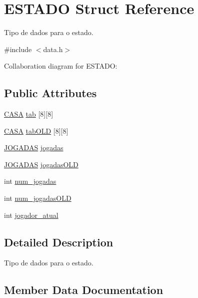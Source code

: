\hypertarget{structESTADO}{}\section{E\+S\+T\+A\+DO Struct Reference}
\label{structESTADO}


Tipo de dados para o estado.  




{\ttfamily \#include $<$data.\+h$>$}



Collaboration diagram for E\+S\+T\+A\+DO\+:
\subsection*{Public Attributes}
\begin{DoxyCompactItemize}
\item 
\hyperlink{data_8h_aba91601f16d4c485b2d9b8c429f27039}{C\+A\+SA} \hyperlink{structESTADO_ab56f0f1be16954d3768b4174d14c087d}{tab} \mbox{[}8\mbox{]}\mbox{[}8\mbox{]}
\item 
\hyperlink{data_8h_aba91601f16d4c485b2d9b8c429f27039}{C\+A\+SA} \hyperlink{structESTADO_a66bbe063098bbfc016ee8a21672e2bbd}{tab\+O\+LD} \mbox{[}8\mbox{]}\mbox{[}8\mbox{]}
\item 
\hyperlink{data_8h_a94c221d29a1760f008b7834093259b7d}{J\+O\+G\+A\+D\+AS} \hyperlink{structESTADO_afae43b87a488fad0f2b56a18bad31d18}{jogadas}
\item 
\hyperlink{data_8h_a94c221d29a1760f008b7834093259b7d}{J\+O\+G\+A\+D\+AS} \hyperlink{structESTADO_a5cbf631c8c361c07715518ef00fae06f}{jogadas\+O\+LD}
\item 
int \hyperlink{structESTADO_a261495728744647e618b4e623f5a4b7a}{num\+\_\+jogadas}
\item 
int \hyperlink{structESTADO_adf9d8248ddf11664485b2754b8b5ffd2}{num\+\_\+jogadas\+O\+LD}
\item 
int \hyperlink{structESTADO_a5dd28e2e68b7aef2b6b7ea88e02eff58}{jogador\+\_\+atual}
\end{DoxyCompactItemize}


\subsection{Detailed Description}
Tipo de dados para o estado. 

\subsection{Member Data Documentation}
\mbox{\label{structESTADO_afae43b87a488fad0f2b56a18bad31d18}} 
